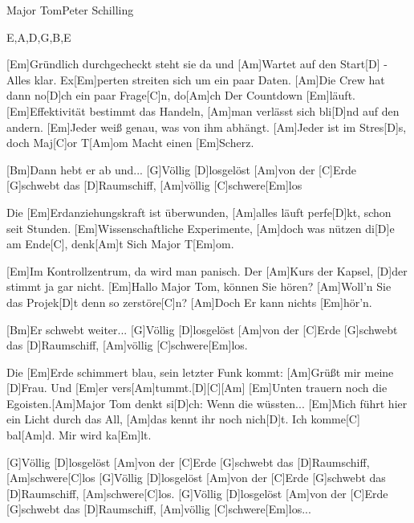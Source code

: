 \documentclass[../main.tex]{subfiles}
\begin{document}
\begin{song}{Major Tom}{Peter Schilling}{}\begin{tabline}{4}{6}{8}{E,A,D,G,B,E}
		\nextbar
		
		\nextbar
		
		\nextbar
		
		\nextbar
\end{tabline}


[Em]Gründlich durchgecheckt steht sie da und [Am]Wartet auf den Start[D] - Alles klar.
Ex[Em]perten streiten sich um ein paar Daten. [Am]Die Crew hat dann no[D]ch ein paar Frage[C]n, do[Am]ch
Der Countdown [Em]läuft.
[Em]Effektivität bestimmt das Handeln, [Am]man verlässt sich bli[D]nd auf den andern.
[Em]Jeder weiß genau, was von ihm abhängt. [Am]Jeder ist im Stres[D]s, doch Maj[C]or T[Am]om
Macht einen [Em]Scherz.

[Bm]Dann hebt er ab und...
[G]Völlig [D]losgelöst [Am]von der [C]Erde [G]schwebt das [D]Raumschiff, [Am]völlig [C]schwere[Em]los

Die [Em]Erdanziehungskraft ist überwunden, [Am]alles läuft perfe[D]kt, schon seit Stunden.
[Em]Wissenschaftliche Experimente, [Am]doch was nützen di[D]e am Ende[C], denk[Am]t
Sich Major T[Em]om.

[Em]Im Kontrollzentrum, da wird man panisch. Der [Am]Kurs der Kapsel, [D]der stimmt ja gar nicht.
[Em]\glqq{}Hallo Major Tom, können Sie hören? [Am]Woll'n Sie das Projek[D]t denn so zerstöre[C]n?\grqq{} [Am]Doch
Er kann nichts [Em]hör'n.

[Bm]Er schwebt weiter...
[G]Völlig [D]losgelöst [Am]von der [C]Erde [G]schwebt das [D]Raumschiff, [Am]völlig [C]schwere[Em]los.

Die [Em]Erde schimmert blau, sein letzter Funk kommt: [Am]\glqq{}Grüßt mir meine [D]Frau.\grqq{}
Und [Em]er vers[Am]tummt.[D]{\hh}[C]{\hh}[Am]{\hh}
[Em]Unten trauern noch die Egoisten.[Am]Major Tom denkt si[D]ch: Wenn die wüssten...
[Em]Mich führt hier ein Licht durch das All, [Am]das kennt ihr noch nich[D]t. Ich komme[C] bal[Am]d.
Mir wird ka[Em]lt.

[G]Völlig [D]losgelöst [Am]von der [C]Erde [G]schwebt das [D]Raumschiff, [Am]schwere[C]los
[G]Völlig [D]losgelöst [Am]von der [C]Erde [G]schwebt das [D]Raumschiff, [Am]schwere[C]los.
[G]Völlig [D]losgelöst [Am]von der [C]Erde [G]schwebt das [D]Raumschiff, [Am]völlig [C]schwere[Em]los...


\end{song}
\end{document}
